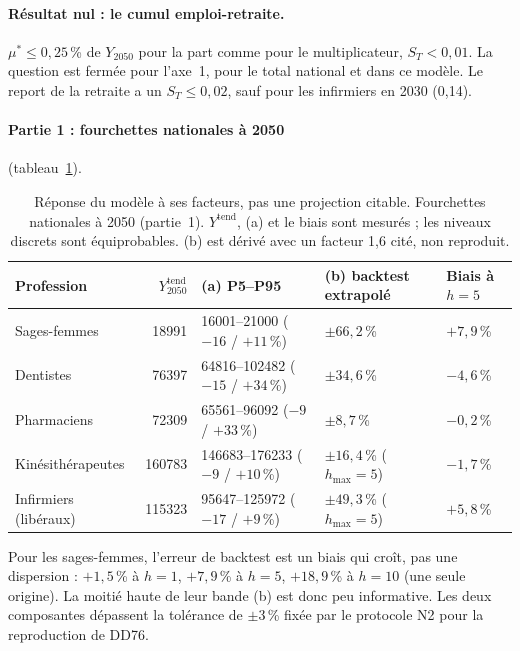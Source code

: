 \paragraph{Résultat nul : le cumul emploi-retraite.} $\mu^* \le 0{,}25$\mesure{}\,\% de $Y_{2050}$ pour la part
comme pour le multiplicateur, $S_T < 0{,}01$\mesure{}. La question est fermée pour l'axe~1, pour le total national et dans ce modèle. Le report de la
retraite a un $S_T \le 0{,}02$\mesure{}, sauf pour les infirmiers en 2030 (0,14\mesure{}).

\paragraph{Partie 1 : fourchettes nationales à 2050} (tableau~\ref{sen:tab:fourchettes}).

\begin{table}[h]
\centering\small
\setlength{\tabcolsep}{4pt}
\begin{tabular}{lrlll}
\toprule
Profession & $Y^{\text{tend}}_{2050}$ & (a) P5--P95 & (b) backtest extrapolé & Biais à $h = 5$ \\
\midrule
Sages-femmes & \num{18991} & \num{16001}--\num{21000} ($-16$ / $+11$\,\%) & $\pm 66{,}2$\,\% & $+7{,}9$\,\% \\
Dentistes & \num{76397} & \num{64816}--\num{102482} ($-15$ / $+34$\,\%) & $\pm 34{,}6$\,\% & $-4{,}6$\,\% \\
Pharmaciens & \num{72309} & \num{65561}--\num{96092} ($-9$ / $+33$\,\%) & $\pm 8{,}7$\,\% & $-0{,}2$\,\% \\
Kinésithérapeutes & \num{160783} & \num{146683}--\num{176233} ($-9$ / $+10$\,\%) & $\pm 16{,}4$\,\% ($h_{\max} = 5$)
  & $-1{,}7$\,\% \\
Infirmiers (libéraux) & \num{115323} & \num{95647}--\num{125972} ($-17$ / $+9$\,\%) & $\pm 49{,}3$\,\%
  ($h_{\max} = 5$) & $+5{,}8$\,\% \\
\bottomrule
\end{tabular}
\caption{Réponse du modèle à ses facteurs, pas une projection citable. Fourchettes nationales à 2050
(partie~1). $Y^{\text{tend}}$, (a) et le biais sont mesurés\mesure{} ; les
niveaux discrets sont équiprobables\suppose{}. (b) est dérivé\derive{} avec un facteur 1,6 cité, non reproduit.}
\label{sen:tab:fourchettes}
\end{table}

Pour les sages-femmes, l'erreur de backtest est un biais qui croît, pas une dispersion : $+1{,}5$\mesure{}\,\% à
$h = 1$, $+7{,}9$\mesure{}\,\% à $h = 5$, $+18{,}9$\mesure{}\,\% à $h = 10$ (une seule origine). La moitié haute de leur bande (b) est donc
peu informative. Les deux composantes dépassent la tolérance de $\pm 3$\suppose{}\,\% fixée par le protocole N2 pour la
reproduction de DD76.

